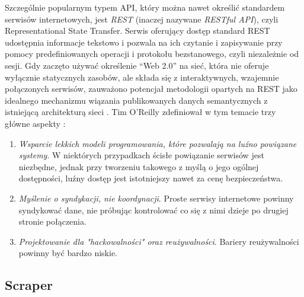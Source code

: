 Szczególnie popularnym typem API, który można nawet określić standardem serwisów internetowych, jest \emph{REST} (inaczej nazywane \emph{RESTful API}), czyli Representational State Transfer.
Serwis oferujący dostęp standard REST udostępnia informacje tekstowo i pozwala na ich czytanie i zapisywanie przy pomocy predefiniowanych operacji i protokołu bezstanowego, czyli niezależnie od sesji.
Gdy zaczęto używać określenie ``Web 2.0'' na sieć, która nie oferuje wyłącznie statycznych zasobów, ale składa się z interaktywnych, wzajemnie połączonych serwisów, zauważono potencjał metodologii opartych na REST jako idealnego mechanizmu wiązania publikowanych danych semantycznych z istniejącą architekturą sieci \cite{battle2008bridging}.
Tim O'Reilly zdefiniował w tym temacie trzy główne aspekty \cite{o2009web}:
\begin{enumerate}
	\item \emph{Wsparcie lekkich modeli programowania, które pozwalają na luźno powiązane systemy}.
	W niektórych przypadkach ścisłe powiązanie serwisów jest niezbędne, jednak przy tworzeniu takowego z myślą o jego ogólnej dostępności, luźny dostęp jest istotniejszy nawet za cenę bezpieczeństwa.
	\item \emph{Myślenie o syndykacji\footnotemark, nie koordynacji}.
	Proste serwisy internetowe powinny syndykować dane, nie próbując kontrolować co się z nimi dzieje po drugiej stronie połączenia.
	\item \emph{Projektowanie dla "hackowalności" oraz reużywalności}.
	Bariery reużywalności powinny być bardzo niskie.
\end{enumerate}

\subsection{Scraper}

